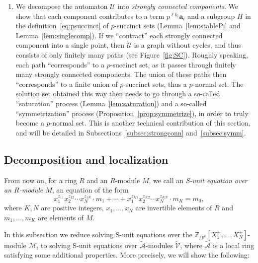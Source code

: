 \documentclass[letterpaper, 11pt, thm-restate]{article}
\numberwithin{equation}{section}
\newcommand{\Zpe}{\mathbb{Z}_{/p^e}}
\newcommand{\mM}{\mathcal{M}}
\newcommand{\ba}{\boldsymbol{a}}
\newcommand{\tmA}{\widetilde{\mathcal{A}}}
\newcommand{\tmV}{\widetilde{\mathcal{V}}}
\newcommand{\mmU}{\mathscr{U}}
\theoremstyle{definition}
\theoremstyle{definition}
\theoremstyle{definition}
\begin{document}
\begin{enumerate}[nosep, label = \arabic*.]
    \setcounter{enumi}{\value{SummaryCounter}}
    \item We decompose the automaton $\mmU$ into \emph{strongly connected components}.
    We show that each component contributes to a term $p^{\ell k_i} \ba_i$ and a subgroup $H$ in the definition~\eqref{eq:psuccinct} of $p$-succinct sets (Lemma~\ref{lem:stablePi} and Lemma~\ref{lem:singlecomp}).
    If we ``contract'' each strongly connected component into a single point, then $\mmU$ is a graph without cycles, and thus consists of only finitely many paths (see Figure~\ref{fig:SC}).
    Roughly speaking, each path ``corresponds'' to a $p$-succinct set, as it passes through finitely many strongly connected components.
    The union of these paths then ``corresponds'' to a finite union of $p$-succinct sets, thus a $p$-normal set.
    The solution set obtained this way then needs to go through a so-called ``saturation'' process (Lemma~\ref{lem:saturation}) and a so-called ``symmetrization'' process (Proposition~\ref{prop:symmetrize}), in order to truly become a $p$-normal set.
    This is another technical contribution of this section, and will be detailed in Subsections~\ref{subsec:strongconn} and~\ref{subsec:symm}.
\end{enumerate}

\subsection{Decomposition and localization}\label{subsec:localize}
From now on, for a ring $R$ and an $R$-module $M$, we call an \emph{S-unit equation over an $R$-module $M$}, an equation of the form
\[
        x_1^{z_{11}} x_2^{z_{12}} \cdots x_N^{z_{1N}} \cdot m_1 + \cdots + x_1^{z_{K1}} x_2^{z_{K2}} \cdots x_N^{z_{KN}} \cdot m_K = m_0,
\]
where $K, N$ are positive integers, $x_1, \ldots, x_N$ are invertible elements of $R$ and $m_1, \ldots, m_K$ are elements of $M$.

In this subsection we reduce solving S-unit equations over the $\Zpe[X_1^{\pm}, \ldots, X_N^{\pm}]$-module $\mM$, to solving S-unit equations over $\tmA$-modules $\tmV$, where $\tmA$ is a local ring satisfying some additional properties.
More precisely, we will show the following:
\end{document}
